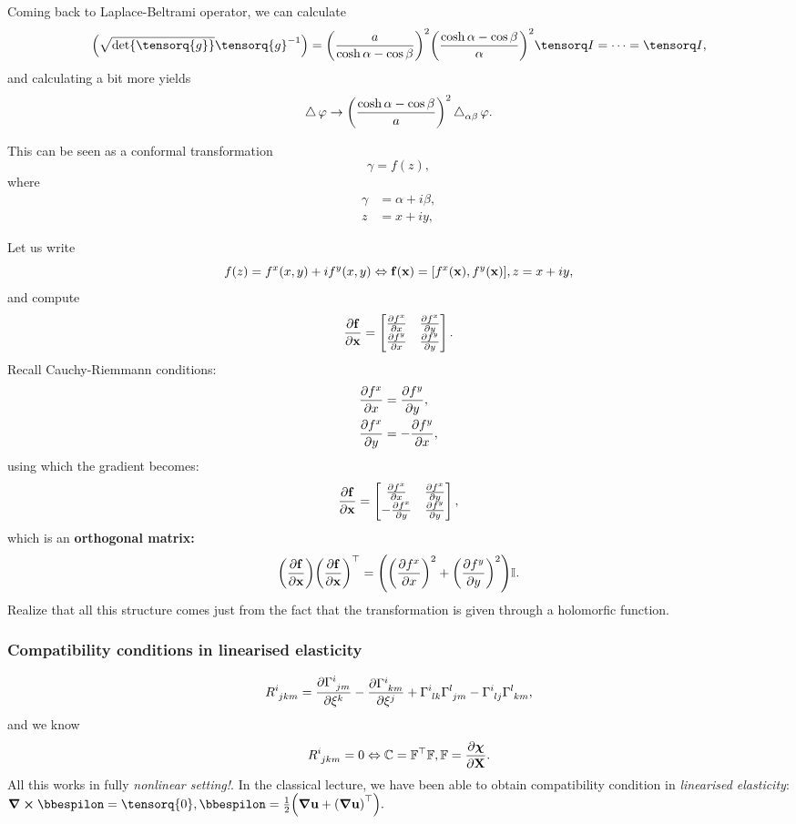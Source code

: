 \documentclass[../main.tex]{subfiles}
\begin{document}
Coming back to Laplace-Beltrami operator, we can calculate
\[
	\qty(\sqrt{\det \tensorq{g}}\inverse{\tensorq{g}})=\qty(\frac{a}{\cosh \alpha-\cos \beta})^{2} \qty(\frac{\cosh \alpha-\cos \beta}{\alpha})^{2} \identity = \dots = \identity,
\]
and calculating a bit more yields
\[
	\operatorname{\bigtriangleup} \varphi \to \qty(\frac{\cosh \alpha-\cos \beta}{a})^{2} \operatorname{\bigtriangleup}_{\alpha \beta}\varphi.
\]
\begin{remark}
    This can be seen as a conformal transformation
    \[
	    \gamma = f(z),
    \]
    where
    \begin{align*}
	    \gamma &= \alpha + i \beta, \\
	    z &= x+iy,
    \end{align*}

Let us write
\[
	f(z) = f^x(x,y) +i f^y(x,y) \Leftrightarrow \vb{f}(\vb{x})=[f^x\qty(\vb{x}),f^y\qty(\vb{x})], z = x+iy,
\]
and compute
\[
	\pdv{\vb{f}}{\vb{x}} = \begin{bmatrix}
		\pdv{f^x}{x} & \pdv{f^x}{y}\\
		\pdv{f^y}{x} & \pdv{f^y}{y}
	\end{bmatrix}.
\]
Recall Cauchy-Riemmann conditions:
\begin{align*}
	\pdv{f^x}{x}&=\pdv{f^y}{y}, \\
	\pdv{f^x}{y}&=-\pdv{f^y}{x},
\end{align*}
using which the gradient becomes:
\[
	\pdv{\vb{f}}{\vb{x}} = \begin{bmatrix}
		\pdv{f^x}{x} & \pdv{f^x}{y}\\
		-\pdv{f^x}{y} & \pdv{f^y}{y}
	\end{bmatrix},
\]
which is an \textbf{orthogonal matrix:}
\[
	\qty(\pdv{\vb{f}}{\vb{x}}) \qty(\pdv{\vb{f}}{\vb{x}})^\top = \qty(\qty(\pdv{f^x}{x})^{2}+\qty(\pdv{f^y}{y})^{2})\mathbb{I}.
\]
Realize that all this structure comes just from the fact that the transformation is given through a holomorfic function.
\end{remark}

\subsubsection{Compatibility conditions in linearised elasticity}
\label{sec:compt_cond}

\[
	R \indices{^i_{jkm}}= \pdv{\Gamma \indices{^i_{jm}}}{\xi^k}-\pdv{\Gamma \indices{^i_{km}}}{\xi^j}+\Gamma \indices{^i_{lk}}\Gamma \indices{^l_{jm}}-\Gamma \indices{^i_{lj}}\Gamma \indices{^l_{km}},
\]
and we know
\[
	R \indices{^i_{jkm}} = 0 \Leftrightarrow \rcg = \transpose{\fgrad} \fgrad, \fgrad = \pdv{\vb*{\chi}}{\vb{X}}.
\]
All this works in fully \textit{nonlinear setting!}. In the classical lecture, we have been able to obtain compatibility condition in \textit{linearised elasticity}: $\curl{\bbespilon} = \tensorq{0}, \bbespilon=\frac{1}{2}\qty(\grad \vb{u}+\transpose{\qty(\grad \vb{u})}).$
\end{document}
